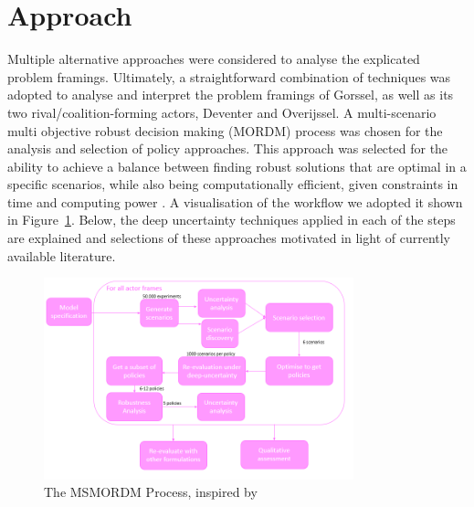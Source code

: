 \section{Approach}
\label{s:approach}


Multiple alternative approaches were considered to analyse the explicated problem framings. Ultimately, a straightforward combination of techniques was adopted to analyse and interpret the problem framings of Gorssel, as well as its two rival/coalition-forming actors, Deventer and Overijssel. A multi-scenario multi objective robust decision making (MORDM) process was chosen for the analysis and selection of policy approaches. This approach was selected for the ability to achieve a balance between finding robust solutions that are optimal in a specific scenarios, while also being computationally efficient, given constraints in time and computing power \parencite{bartholomew_considering_2020}. A visualisation of the workflow we adopted it shown in Figure~\ref{fig:msmordm}. Below, the deep uncertainty techniques applied in each of the steps are explained and selections of these approaches motivated in light of currently available literature. 

\begin{figure}[h]
    \centering
    \includegraphics[width=0.8\textwidth]{report/figures/methodology.png}
    \caption{The MSMORDM Process, inspired by  \citeauthor{bartholomew_considering_2020}}
    \label{fig:msmordm}
\end{figure}

